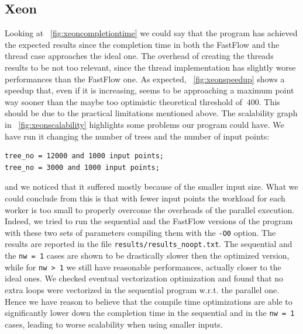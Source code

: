 \documentclass[10pt]{article}
\numberwithin{equation}{section}
\begin{document}
\subsection{Xeon}
Looking at \figurename~\ref{fig:xeoncompletiontime} we could say that the program has achieved the expected results since the completion time in both the FastFlow and the thread case approaches the ideal one. The overhead of creating the threads results to be not too relevant, since the thread implementation has slightly worse performances than the FastFlow one. As expected, \figurename~\ref{fig:xeonspeedup} shows a speedup that, even if it is increasing, seems to be approaching a maximum point way sooner than the maybe too optimistic theoretical threshold of $~400$. This should be due to the practical limitations mentioned above. The scalability graph in \figurename~\ref{fig:xeonscalability} highlights some problems our program could have. We have run it changing the number of trees and the number of input points:
\begin{verbatim}
tree_no = 12000 and 1000 input points;
tree_no = 3000 and 1000 input points;
\end{verbatim}
and we noticed that it suffered mostly because of the smaller input size. What we could conclude from this is that with fewer input points the workload for each worker is too small to properly overcome the overheads of the parallel execution. Indeed, we tried to run the sequential and the FastFlow versions of the program with these two sets of parameters compiling them with the \verb|-O0| option. The results are reported in the file \verb|results/results_noopt.txt|. The sequential and the \verb|nw = 1| cases are shown to be drastically slower then the optimized version, while for \verb|nw > 1| we still have reasonable performances, actually closer to the ideal ones. We checked eventual vectorization optimization and found that no extra loops were vectorized in the sequential program w.r.t. the parallel one. Hence we have reason to believe that the compile time optimizations are able to significantly lower down the completion time in the sequential and in the \verb|nw = 1| cases, leading to worse scalability when using smaller inputs.
\end{document}
